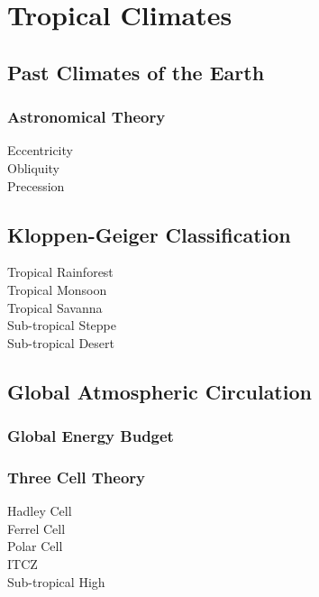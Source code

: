 \documentclass[../../main]{subfiles}
\begin{document}
\section{Tropical Climates}

\subsection{Past Climates of the Earth}

	\subsubsection{Astronomical Theory}

	\begin{description}
		\item[Eccentricity]
		\item[Obliquity]
		\item[Precession]
	\end{description}

\subsection{Kloppen-Geiger Classification}

	\begin{description}
		\item[Tropical Rainforest]
		\item[Tropical Monsoon]
		\item[Tropical Savanna]
		\item[Sub-tropical Steppe]
		\item[Sub-tropical Desert]
	\end{description}

\subsection{Global Atmospheric Circulation}

	\subsubsection{Global Energy Budget}

	\subsubsection{Three Cell Theory}

	\begin{description}
		\item[Hadley Cell]
		\item[Ferrel Cell]
		\item[Polar Cell]
		\item[ITCZ]
		\item[Sub-tropical High]
	\end{description}
\end{document}
